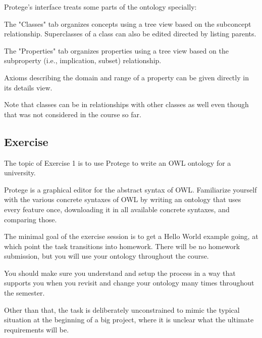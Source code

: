 Protege's interface treats some parts of the ontology specially:
\begin{compactitem}
 \item The "Classes" tab organizes concepts using a tree view based on the subconcept relationship.
 Superclasses of a class can also be edited directed by listing parents.
 \item The "Properties" tab organizes properties using a tree view based on the subproperty (i.e., implication, subset) relationship.
 \item Axioms describing the domain and range of a property can be given directly in its details view.
\end{compactitem}

Note that classes can be in relationships with other classes as well even though that was not considered in the course so far.

\subsection{Exercise}

The topic of Exercise 1 is to use Protege to write an OWL ontology for a university.

Protege is a graphical editor for the abstract syntax of OWL.
Familiarize yourself with the various concrete syntaxes of OWL by writing an ontology that uses every feature once, downloading it in all available concrete syntaxes, and comparing those.

The minimal goal of the exercise session is to get a Hello World example going, at which point the task transitions into homework.
There will be no homework submission, but you will use your ontology throughout the course.

You should make sure you understand and setup the process in a way that supports you when you revisit and change your ontology many times throughout the semester.

Other than that, the task is deliberately unconstrained to mimic the typical situation at the beginning of a big project, where it is unclear what the ultimate requirements will be.